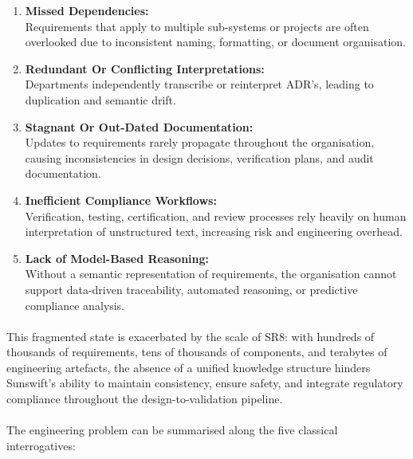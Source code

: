         \begin{enumerate}
          \item \textbf{Missed Dependencies:} \\ Requirements that apply to multiple sub-systems or projects are often overlooked due to inconsistent naming, formatting, or document organisation.
          \item \textbf{Redundant Or Conflicting Interpretations:} \\ Departments independently transcribe or reinterpret ADR's, leading to duplication and semantic drift.
          \item \textbf{Stagnant Or Out-Dated Documentation:} \\ Updates to requirements rarely propagate throughout the organisation, causing inconsistencies in design decisions, verification plans, and audit documentation.
          \item \textbf{Inefficient Compliance Workflows:} \\ Verification, testing, certification, and review processes rely heavily on human interpretation of unstructured text, increasing risk and engineering overhead.
          \item \textbf{Lack of Model-Based Reasoning:} \\ Without a semantic representation of requirements, the organisation cannot support data-driven traceability, automated reasoning, or predictive compliance analysis.
        \end{enumerate}

        \paragraph{} This fragmented state is exacerbated by the scale of SR8: with hundreds of thousands of requirements, tens of thousands of components, and terabytes of engineering artefacts, the absence of a unified knowledge structure hinders Sunswift’s ability to maintain consistency, ensure safety, and integrate regulatory compliance throughout the design-to-validation pipeline.

        \newpage
        \paragraph{} The engineering problem can be summarised along the five classical interrogatives:

